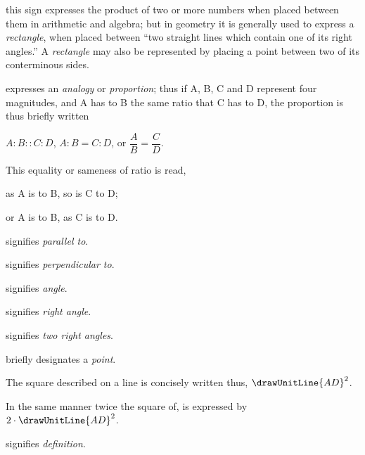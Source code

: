 \documentclass[booklanguage=english]{byrnebook}
\begin{document}
\symb{$\times$}
 this sign expresses the product of two or more numbers when placed between them in arithmetic and algebra; but in geometry it is generally used to express a \emph{rectangle}, when placed between \enquote{two straight lines which contain one of its right angles.} A \emph{rectangle} may also be represented by placing a point between two of its conterminous sides.

\symb{$:\ ::\ :$}
 expresses an \emph{analogy} or \emph{proportion}; thus if A, B, C and D represent four magnitudes, and A has to B the same ratio that C has to D, the proportion is thus briefly written

$A : B :: C : D$, $A : B = C : D$, or $\dfrac{A}{B} = \dfrac{C}{D}$.

This equality or sameness of ratio is read,

as A is to B, so is C to D;

or A is to B, as C is to D.

\symb{$\parallel$}
 signifies \emph{parallel to}.

\symb{$\perp$}
 signifies \emph{perpendicular to}.


 signifies \emph{angle}.

 signifies \emph{right angle}.

\symb{\drawTwoRightAngles}
 signifies \emph{two right angles}.


briefly designates a \emph{point}.

The square described on a line is concisely written thus, $\drawUnitLine{AD}^2$.

In the same manner twice the square of, is expressed by $2 \cdot \drawUnitLine{AD}^2$.

\symb{\indefstr}
 signifies \emph{definition}.
\end{document}
